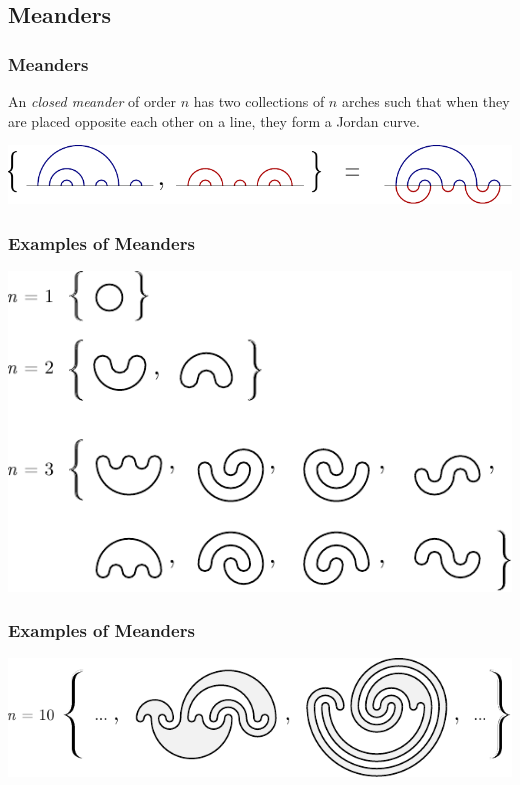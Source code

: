\documentclass{beamer}
\begin{document}
\subsection{Meanders}
\begin{frame}
\frametitle{Meanders}
\begin{definition}
An \emph{closed meander} of order $n$ has two collections of $n$ arches such that when they are placed opposite each other on a line, they form a Jordan curve.
\end{definition}
\begin{center}
\includegraphics[width=.8\textwidth]{meanders/meander-defn.pdf}
\end{center}
\end{frame}

\begin{frame}
\frametitle{Examples of Meanders}
\begin{center}
\includegraphics[width=.8\textwidth]{meanders/12-and-3.pdf}
\end{center}

\end{frame}

\begin{frame}
\frametitle{Examples of Meanders}
\begin{center}
\includegraphics[width=.8\textwidth]{meanders/order-10.pdf}
\end{center}

\end{frame}
\end{document}
